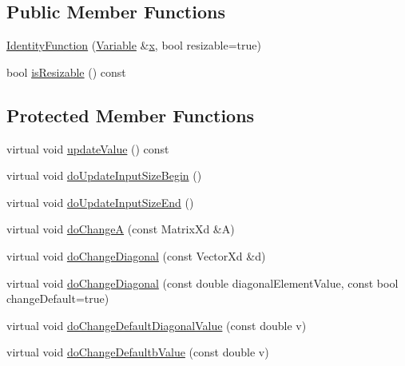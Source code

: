 \subsection*{Public Member Functions}
\begin{DoxyCompactItemize}
\item 
\hyperlink{classocra_1_1IdentityFunction_a65a20f4b0036a5a6ca7b0e92e34dc1b0}{Identity\+Function} (\hyperlink{classocra_1_1Variable}{Variable} \&\hyperlink{classocra_1_1Function_a28825886d1f149c87b112ec2ec1dd486}{x}, bool resizable=true)
\item 
bool \hyperlink{classocra_1_1IdentityFunction_a9e132560796e23e5d9395885277285d1}{is\+Resizable} () const 
\end{DoxyCompactItemize}
\subsection*{Protected Member Functions}
\begin{DoxyCompactItemize}
\item 
virtual void \hyperlink{classocra_1_1IdentityFunction_a6a82e66a51360fb97f95ae334f4e8ee0}{update\+Value} () const 
\item 
virtual void \hyperlink{classocra_1_1IdentityFunction_aa8d5ff0e25422b3b5a4a2a8621120790}{do\+Update\+Input\+Size\+Begin} ()
\item 
virtual void \hyperlink{classocra_1_1IdentityFunction_adcfa8a32491113a590e7066f0062fbc6}{do\+Update\+Input\+Size\+End} ()
\item 
virtual void \hyperlink{classocra_1_1IdentityFunction_aa1a9f42b9b1b62182d99ea32dae6e815}{do\+ChangeA} (const Matrix\+Xd \&A)
\end{DoxyCompactItemize}
{\bf }\par
\begin{DoxyCompactItemize}
\item 
virtual void \hyperlink{classocra_1_1IdentityFunction_aea94175430c2c785dbb9d551922be9ad}{do\+Change\+Diagonal} (const Vector\+Xd \&d)
\item 
virtual void \hyperlink{classocra_1_1IdentityFunction_ac6350bcc2107b56e96642cacbbee2404}{do\+Change\+Diagonal} (const double diagonal\+Element\+Value, const bool change\+Default=true)
\item 
virtual void \hyperlink{classocra_1_1IdentityFunction_ad54cf6c0b28f6d4955f15ebd53c6ca1f}{do\+Change\+Default\+Diagonal\+Value} (const double v)
\item 
virtual void \hyperlink{classocra_1_1IdentityFunction_a989f91f6ec4e2e00aa5ac3cc8b6a2b66}{do\+Change\+Defaultb\+Value} (const double v)
\end{DoxyCompactItemize}

